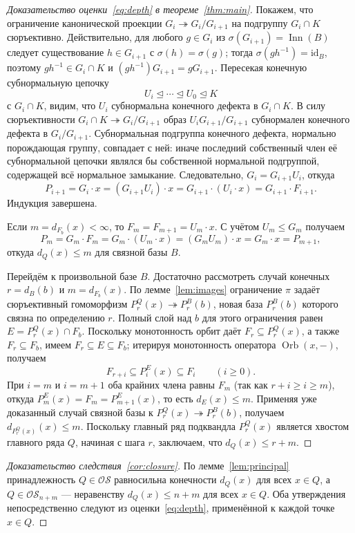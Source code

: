 \documentclass[11pt,a4paper]{article}
\theoremstyle{remark}
\newcommand{\OS}{\mathcal{OS}}
\newcommand{\Inn}{\operatorname{Inn}}
\newcommand{\Orb}{\operatorname{Orb}}
\begin{document}
\begin{proof}[Доказательство оценки~\eqref{eq:depth} в теореме~\ref{thm:main}]
Покажем, что ограничение канонической проекции
\(G_i\twoheadrightarrow G_i/G_{i+1}\) на подгруппу \(G_i\cap K\)
сюръективно. Действительно, для любого \(g\in G_i\) из
\(\sigma(G_{i+1})=\Inn(B)\) следует существование \(h\in G_{i+1}\) с
\(\sigma(h)=\sigma(g)\); тогда \(\sigma(gh^{-1})=\mathrm{id}_B\),
поэтому \(gh^{-1}\in G_i\cap K\) и \((gh^{-1})G_{i+1}=gG_{i+1}\).
Пересекая конечную субнормальную цепочку
\[
  U_i\trianglelefteq\cdots\trianglelefteq U_0\trianglelefteq K
\]
с \(G_i\cap K\), видим, что \(U_i\) субнормальна конечного дефекта в
\(G_i\cap K\). В силу сюръективности \(G_i\cap K\twoheadrightarrow G_i/G_{i+1}\)
образ \(U_iG_{i+1}/G_{i+1}\) субнормален конечного дефекта в
\(G_i/G_{i+1}\). Субнормальная подгруппа конечного дефекта, нормально
порождающая группу, совпадает с ней: иначе последний собственный член её
субнормальной цепочки являлся бы собственной нормальной подгруппой,
содержащей всё нормальное замыкание. Следовательно,
\(G_i=G_{i+1}U_i\), откуда
\[
  P_{i+1}=G_i\cdot x=(G_{i+1}U_i)\cdot x
  =G_{i+1}\cdot(U_i\cdot x)=G_{i+1}\cdot F_{i+1}.
\]
Индукция завершена.

Если \(m=d_{F_b}(x)<\infty\), то \(F_m=F_{m+1}=U_m\cdot x\). С учётом
\(U_m\le G_m\) получаем
\[
  P_m=G_m\cdot F_m=G_m\cdot(U_m\cdot x)=(G_mU_m)\cdot x
  =G_m\cdot x=P_{m+1},
\]
откуда \(d_Q(x)\le m\) для связной базы \(B\).

Перейдём к произвольной базе \(B\). Достаточно рассмотреть случай
конечных \(r=d_B(b)\) и \(m=d_{F_b}(x)\). По лемме~\ref{lem:images}
ограничение \(\pi\) задаёт сюръективный гомоморфизм
\(P_r^Q(x)\twoheadrightarrow P_r^B(b)\), новая база \(P_r^B(b)\)
которого связна по определению \(r\). Полный слой над \(b\) для этого
ограничения равен \(E=P_r^Q(x)\cap F_b\). Поскольку монотонность орбит
даёт \(F_r\subseteq P_r^Q(x)\), а также \(F_r\subseteq F_b\), имеем
\(F_r\subseteq E\subseteq F_b\); итерируя монотонность оператора
\(\Orb(x,-)\), получаем
\[
  F_{r+i}\subseteq P_i^E(x)\subseteq F_i\qquad(i\ge 0).
\]
При \(i=m\) и \(i=m+1\) оба крайних члена равны \(F_m\) (так как
\(r+i\ge i\ge m\)), откуда \(P_m^E(x)=F_m=P_{m+1}^E(x)\), то есть
\(d_E(x)\le m\). Применяя уже доказанный случай связной базы к
\(P_r^Q(x)\twoheadrightarrow P_r^B(b)\), получаем
\(d_{P_r^Q(x)}(x)\le m\). Поскольку главный ряд подквандла \(P_r^Q(x)\)
является хвостом главного ряда \(Q\), начиная с шага \(r\), заключаем,
что \(d_Q(x)\le r+m\).
\end{proof}

\begin{proof}[Доказательство следствия~\ref{cor:closure}]
По лемме~\ref{lem:principal} принадлежность \(Q\in\OS\) равносильна
конечности \(d_Q(x)\) для всех \(x\in Q\), а \(Q\in\OS_{n+m}\) ---
неравенству \(d_Q(x)\le n+m\) для всех \(x\in Q\). Оба утверждения
непосредственно следуют из оценки~\eqref{eq:depth}, применённой к каждой
точке \(x\in Q\).
\end{proof}
\end{document}
